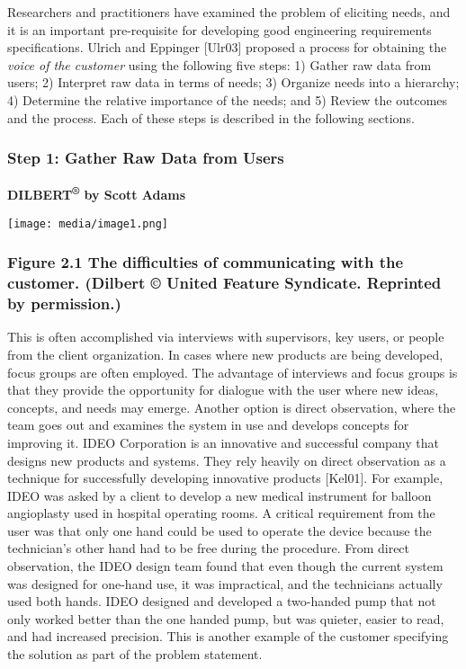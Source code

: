 Researchers and practitioners have examined the problem of eliciting
needs, and it is an important pre-requisite for developing good
engineering requirements specifications. Ulrich and Eppinger {[}Ulr03{]}
proposed a process for obtaining the \emph{voice of the customer} using
the following five steps: 1) Gather raw data from users; 2) Interpret
raw data in terms of needs; 3) Organize needs into a hierarchy; 4)
Determine the relative importance of the needs; and 5) Review the
outcomes and the process. Each of these steps is described in the
following sections.

\subsubsection*{\texorpdfstring{\hfill\break
Step 1: Gather Raw Data from
Users}{ Step 1: Gather Raw Data from Users}}\label{step-1-gather-raw-data-from-users}

\textbf{DILBERT\textsuperscript{®} by Scott Adams}

\texttt{[image: media/image1.png]}

\subsubsection*{Figure 2.1 The difficulties of communicating with the
customer. (Dilbert © United Feature Syndicate. Reprinted by
permission.)}\label{figure-2.1-the-difficulties-of-communicating-with-the-customer.-dilbert-united-feature-syndicate.-reprinted-by-permission.}

This is often accomplished via interviews with supervisors, key users,
or people from the client organization. In cases where new products are
being developed, focus groups are often employed. The advantage of
interviews and focus groups is that they provide the opportunity for
dialogue with the user where new ideas, concepts, and needs may emerge.
Another option is direct observation, where the team goes out and
examines the system in use and develops concepts for improving it. IDEO
Corporation is an innovative and successful company that designs new
products and systems. They rely heavily on direct observation as a
technique for successfully developing innovative products {[}Kel01{]}.
For example, IDEO was asked by a client to develop a new medical
instrument for balloon angioplasty used in hospital operating rooms. A
critical requirement from the user was that only one hand could be used
to operate the device because the technician's other hand had to be free
during the procedure. From direct observation, the IDEO design team
found that even though the current system was designed for one-hand use,
it was impractical, and the technicians actually used both hands. IDEO
designed and developed a two-handed pump that not only worked better
than the one handed pump, but was quieter, easier to read, and had
increased precision. This is another example of the customer specifying
the solution as part of the problem statement.

